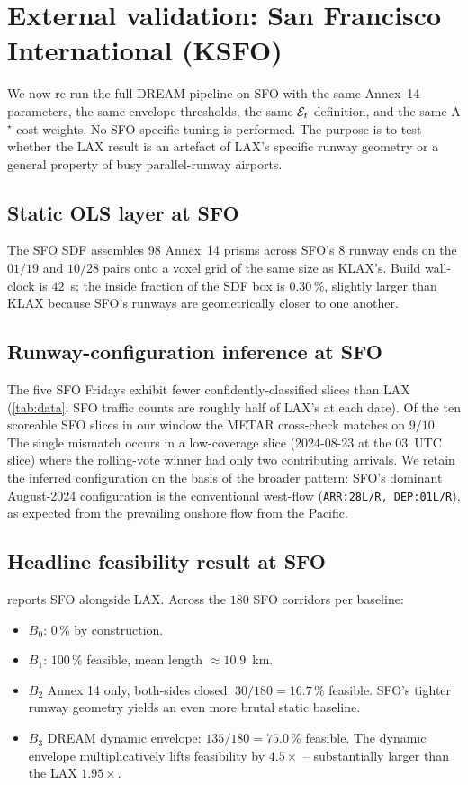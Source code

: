 \section{External validation: San Francisco International (KSFO)}
\label{sec:sfo}

We now re-run the full DREAM pipeline on SFO with the same Annex~14
parameters, the same envelope thresholds, the same $\mathcal{E}_t$ definition, and
the same A$^\star$ cost weights. No SFO-specific tuning is performed. The
purpose is to test whether the LAX result is an artefact of LAX's specific
runway geometry or a general property of busy parallel-runway airports.

\subsection{Static OLS layer at SFO}
\label{sec:sfo-sdf}

The SFO SDF assembles $98$ Annex~14 prisms across SFO's 8 runway ends on
the $01/19$ and $10/28$ pairs onto a voxel grid of the same size as
KLAX's. Build wall-clock is $42$~s; the inside fraction of the SDF box is
$0.30\,\%$, slightly larger than KLAX because SFO's runways are
geometrically closer to one another.

\subsection{Runway-configuration inference at SFO}
\label{sec:sfo-config}

The five SFO Fridays exhibit fewer confidently-classified slices than LAX
(\cref{tab:data}: SFO traffic counts are roughly half of LAX's at each
date). Of the ten scoreable SFO slices in our window the METAR cross-check
matches on $9/10$. The single mismatch occurs in a low-coverage slice
(2024-08-23 at the 03~UTC slice) where the rolling-vote winner had only
two contributing arrivals. We retain the inferred configuration on the
basis of the broader pattern: SFO's dominant August-2024 configuration is
the conventional west-flow (\texttt{ARR:28L/R, DEP:01L/R}), as expected
from the prevailing onshore flow from the Pacific.

\subsection{Headline feasibility result at SFO}
\label{sec:sfo-feasibility}

 reports SFO alongside LAX. Across the $180$ SFO
corridors per baseline:
\begin{itemize}
\item $B_0$: $0\,\%$ by construction.
\item $B_1$: $100\,\%$ feasible, mean length $\approx 10.9$~km.
\item $B_2$ Annex 14 only, both-sides closed: $30/180 = 16.7\,\%$ feasible.
    SFO's tighter runway geometry yields an even more brutal static
    baseline.
\item $B_3$ DREAM dynamic envelope: $135/180 = 75.0\,\%$ feasible. The
    dynamic envelope multiplicatively lifts feasibility by $\boldsymbol{4.5\times}$
    -- substantially larger than the LAX $1.95\times$.
\end{itemize}

